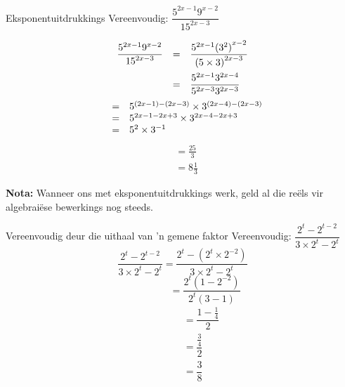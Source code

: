      
\begin{wex}{Eksponentuitdrukkings}
{Vereenvoudig: $\dfrac{{5}^{2x-1}{9}^{x-2}}{{15}^{2x-3}}$}
{

\begin{equation*}
\begin{array}{lcl} \dfrac{{5}^{2x-1}  {9}^{x-2}}{{15}^{2x-3}}& =& \dfrac{{5}^{2x-1}  {({3}^{2})}^{x-2}}{{(5\times3)}^{2x-3}}\hfill \vspace{5pt}\\
		  & =& \dfrac{{5}^{2x-1}  {3}^{2x-4}}{{5}^{2x-3}  {3}^{2x-3}}\hfill 
\end{array}
\end{equation*}
\begin{equation*}
\begin{array}{lcl}
& =& {5}^{(2x-1)-(2x-3)} \times {3}^{(2x-4)-(2x-3)}\hfill \\ 
& =& 5^{2x-1-2x+3} \times 3^{2x-4 - 2x+3} \\
& =& {5}^{2} \times {3}^{-1}\hfill \end{array}
\end{equation*}
\begin{align*}
  &= \frac{25}{3} \\
  &= 8\frac{1}{3}
\end{align*}
}
\end{wex}

\textbf{Nota:} Wanneer ons met eksponentuitdrukkings werk, geld al die re\"els vir algebrai\"ese bewerkings nog steeds.

\begin{wex}{Vereenvoudig deur die uithaal van 'n gemene faktor}
{Vereenvoudig: $\dfrac{2^t-2^{t-2}}{3 \times 2^t - 2^t}$}
{
\begin{equation*}
  \dfrac{2^t-2^{t-2}}{3 \times 2^t-2^t} =
  \dfrac{2^t-(2^t \times 2^{-2})}{3 \times 2^t - 2^t}
\end{equation*}
\begin{equation*}
  \phantom{\frac{2^t-2^{t-2}}{3 \times 2^t-2^t}} = \frac{2^t(1-2^{-2})}{2^t(3-1)}
\end{equation*}
\begin{align*}
  \phantom{\frac{2^t-2^{t-2}}{3.2^t-2^t}}
  &= \dfrac{1- \frac{1}{4}}{2} \\
  &= \dfrac{\frac{3}{4}}{2} \\
  &= \dfrac{3}{8} 
\end{align*}
} 
\end{wex}


